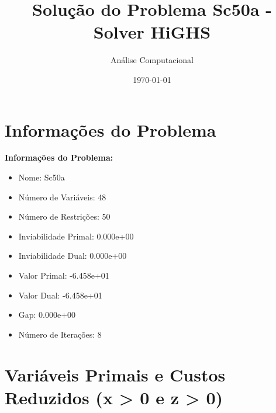 \documentclass[12pt]{article}
\title{Solução do Problema Sc50a - Solver HiGHS}
\author{Análise Computacional}
\date{\today}
\begin{document}
\maketitle

\section{Informações do Problema}

\textbf{Informações do Problema:}
\begin{itemize}
\item Nome: Sc50a
\item Número de Variáveis: 48
\item Número de Restrições: 50
\item Inviabilidade Primal: 0.000e+00
\item Inviabilidade Dual: 0.000e+00
\item Valor Primal: -6.458e+01
\item Valor Dual: -6.458e+01
\item Gap: 0.000e+00
\item Número de Iterações: 8
\end{itemize}


\section{Variáveis Primais e Custos Reduzidos (x > 0 e z > 0)}
\end{document}
